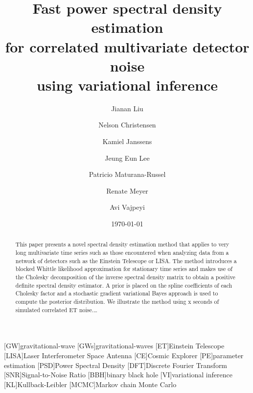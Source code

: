 \documentclass[%
 reprint,
 amsmath,amssymb,
 aps,
]{revtex4-2}
\begin{document}


\title{
Fast power spectral density estimation \\
for correlated multivariate detector noise \\
using variational inference
}%

\author{Jianan Liu}
\author{Nelson Christensen}
\author{Kamiel Janssens}%
\author{Jeung Eun Lee}
\author{Patricio Maturana-Russel}
\author{Renate Meyer}
\author{Avi Vajpeyi}

%

\date{\today}%

\begin{abstract}
 This paper presents a novel spectral density estimation method that applies to very long multivariate time series such as those encountered when analyzing data from a network of detectors such as the Einstein Telescope or LISA. The method introduces a blocked Whittle likelihood approximation for stationary time series and makes use of the Cholesky decomposition of the inverse spectral density matrix to obtain a positive definite spectral density estimator. A prior is placed on the spline coefficients of each Cholesky factor and a stochastic gradient variational Bayes approach is used to compute the posterior distribution. We illustrate the method using x seconds of simulated correlated ET noise.\ldots
\end{abstract}

\maketitle


\begin{acronym}
    [GW]{gravitational-wave}
    [GWs]{gravitational-waves}
    [ET]{Einstein Telescope}
    [LISA]{Laser Interferometer Space Antenna}
    [CE]{Cosmic Explorer}
    [PE]{parameter estimation}
    [PSD]{Power Spectral Density}
    [DFT]{Discrete Fourier Transform}
    [SNR]{Signal-to-Noise Ratio}
    [BBH]{binary black hole}
    [VI]{variational inference}
    [KL]{Kullback-Leibler}
    [MCMC]{Markov chain Monte Carlo}
\end{acronym}
\end{document}
